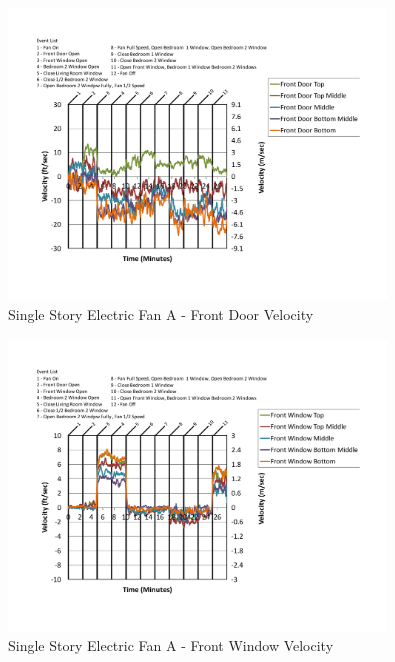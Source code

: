 \documentclass{article}
\begin{document}
\begin{appendices}
	\begin{figure}[H]
		\centering
		\includegraphics[height=3.05in,trim=0.67in 1.1in 0.67in 0.8in,clip=true]{0_Images/Results_Charts/ColdFlow/Single_Story/Electric/A/Front_Door_Velocity.pdf}
		\caption{Single Story Electric Fan A - Front Door Velocity}
	\end{figure}
 

	\begin{figure}[H]
		\centering
		\includegraphics[height=3.05in,trim=0.67in 1.1in 0.67in 0.8in,clip=true]{0_Images/Results_Charts/ColdFlow/Single_Story/Electric/A/Front_Window_Velocity.pdf}
		\caption{Single Story Electric Fan A - Front Window Velocity}
	\end{figure}
 
	\clearpage


\end{appendices}
\end{document}
